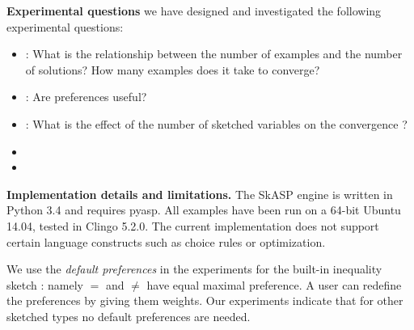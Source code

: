\textbf{Experimental questions}  we have designed and investigated the following experimental questions:
\begin{itemize}
\item \qone: What is the relationship between the number of examples and the number of solutions? How many examples does it take to converge?
\item \qtwo: Are preferences useful?
\item \qthree: What is the effect of the number of sketched variables on the convergence ?
\item {}
\item {}
\end{itemize}


\textbf{Implementation details and limitations.} The SkASP engine is written in Python 3.4 and requires pyasp. All examples have been run on a 64-bit Ubuntu 14.04, tested in Clingo 5.2.0. The current implementation does not support certain language constructs such as choice rules or optimization. 


We use the \textit{default preferences} in the experiments for the built-in inequality sketch \sketchedeq: namely $=$ and $\neq$ have equal maximal preference. A user can redefine the preferences by giving them weights. Our experiments indicate that for other sketched types no default preferences are needed.


